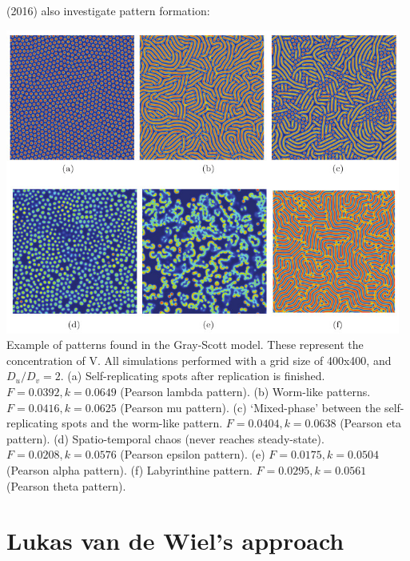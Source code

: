 \textcite{haqh16} (2016) also investigate pattern formation:
\begin{center}
\includegraphics[width=13cm]{python_codes/fieldstone_171/images/haqh16}\\
{\captionfont 
Example of patterns found in the Gray-Scott model. These represent
the concentration of V. All simulations performed with a grid size of 400x400,
and $D_u/D_v=2$. 
(a) Self-replicating spots after replication is ﬁnished. $F=0.0392,k=0.0649$ (Pearson lambda pattern). 
(b) Worm-like patterns. $F=0.0416,k=0.0625$ (Pearson mu pattern). 
(c) `Mixed-phase' between the self-replicating spots and the worm-like pattern. $F=0.0404,k=0.0638$ (Pearson eta pattern). 
(d) Spatio-temporal chaos (never reaches steady-state). $F=0.0208,k=0.0576$ (Pearson epsilon pattern).
(e) $F=0.0175,k=0.0504$ (Pearson alpha pattern). 
(f) Labyrinthine pattern. $F=0.0295,k=0.0561$ (Pearson theta pattern).}
\end{center}



\section*{Lukas van de Wiel's approach}

